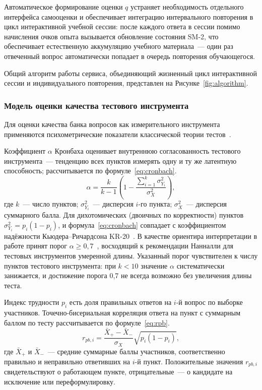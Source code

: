 Автоматическое формирование оценки $q$ устраняет необходимость
отдельного интерфейса самооценки и обеспечивает интеграцию
интервального повторения в цикл интерактивной учебной сессии:
после каждого ответа в сессии помимо начисления очков опыта
вызывается обновление состояния SM-2, что обеспечивает естественную
аккумуляцию учебного материала~--- один раз отвеченный вопрос
автоматически попадает в очередь повторения обучающегося.

Общий алгоритм работы сервиса, объединяющий жизненный цикл
интерактивной сессии и индивидуального повторения, представлен
на Рисунке~\ref{fig:algorithm}.


\subsubsection{Модель оценки качества тестового инструмента}

Для оценки качества банка вопросов как измерительного инструмента
применяются психометрические показатели классической теории
тестов~\cite{cronbach1951,crocker_algina}.

Коэффициент $\alpha$ Кронбаха оценивает внутреннюю согласованность
тестового инструмента~--- тенденцию всех пунктов измерять одну
и ту же латентную способность; рассчитывается
по формуле~\eqref{eq:cronbach}.
\begin{equation}\label{eq:cronbach}
    \alpha = \frac{k}{k - 1} \left(1 - \frac{\sum_{i=1}^{k} \sigma_{Y_i}^2}{\sigma_X^2}\right),
\end{equation}
где $k$~--- число пунктов; $\sigma_{Y_i}^2$~--- дисперсия $i$-го
пункта; $\sigma_X^2$~--- дисперсия суммарного балла. Для
дихотомических (двоичных по корректности) пунктов
$\sigma_{Y_i}^2 = p_i (1 - p_i)$, и формула~\eqref{eq:cronbach}
совпадает с коэффициентом надёжности
Кьюдера--Ричардсона KR-20~\cite{crocker_algina}. В качестве
ориентира интерпретации в работе принят порог
$\alpha \geq 0{,}7$~\cite{crocker_algina}, восходящий
к рекомендации Нанналли для тестовых инструментов умеренной
длины. Указанный порог чувствителен к числу пунктов
тестового инструмента: при $k < 10$ значение $\alpha$
систематически занижается, и достижение порога 0,7
не всегда возможно без увеличения длины теста.

Индекс трудности $p_i$ есть доля правильных ответов на $i$-й
вопрос по выборке участников. Точечно-бисериальная корреляция
ответа на пункт с суммарным баллом по тесту рассчитывается
по формуле~\eqref{eq:rpb}.
\begin{equation}\label{eq:rpb}
    r_{pb,i} = \frac{\bar{X}_{+} - \bar{X}_{-}}{\sigma_X} \sqrt{p_i (1 - p_i)},
\end{equation}
где $\bar{X}_{+}$ и $\bar{X}_{-}$~--- средние суммарные баллы
участников, соответственно правильно и неправильно ответивших
на $i$-й пункт. Положительные значения $r_{pb,i}$ свидетельствуют
о работающем пункте, отрицательные~--- о кандидате на исключение
или переформулировку.

